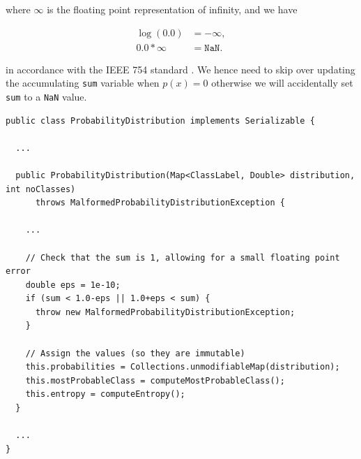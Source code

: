 \documentclass[12pt,twoside,notitlepage]{report}
\begin{document}
                where $\infty$ is the floating point representation of infinity, and we have 

                \begin{align}
                  \log(0.0) &= -\infty, \\
                  0.0 * \infty &= \texttt{NaN}.  
                \end{align}

                in accordance with the IEEE 754 standard \cite{1985--ieee754}. We hence need to skip over updating the 
                accumulating \texttt{sum} variable when $p(x) = 0$ otherwise we will accidentally set \texttt{sum} to a 
                \texttt{NaN} value.

                \begin{lstlisting}[caption={Part of the \texttt{ProbabilityDirstribution} constructor, where we set $\epsilon = 2^{-10}$.}]
public class ProbabilityDistribution implements Serializable {

  ...

  public ProbabilityDistribution(Map<ClassLabel, Double> distribution, int noClasses) 
      throws MalformedProbabilityDistributionException {
    
    ...
    
    // Check that the sum is 1, allowing for a small floating point error
    double eps = 1e-10;
    if (sum < 1.0-eps || 1.0+eps < sum) {
      throw new MalformedProbabilityDistributionException;
    }
    
    // Assign the values (so they are immutable)
    this.probabilities = Collections.unmodifiableMap(distribution);
    this.mostProbableClass = computeMostProbableClass();
    this.entropy = computeEntropy();
  }

  ...
}
                \end{lstlisting}                
\end{document}
